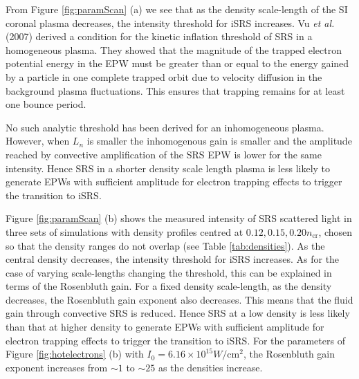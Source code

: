 From Figure \ref{fig:paramScan} (a) we see that as the density scale-length of the SI coronal plasma decreases, the intensity threshold for iSRS increases. Vu \textit{et al.} (2007) \cite{Vu2007} derived a condition for the kinetic inflation threshold of SRS in a homogeneous plasma. They showed that the magnitude of the trapped electron potential energy in the EPW must be greater than or equal to the energy gained by a particle in one complete trapped orbit due to velocity diffusion in the
background plasma fluctuations. This ensures that trapping remains for at least one bounce period.

No such analytic threshold has been derived for an inhomogeneous plasma.
However, when $L_n$ is smaller the inhomogenous gain is smaller and the amplitude reached by convective amplification of the SRS EPW is lower for the same intensity.
Hence SRS in a shorter density scale length plasma is less likely to generate EPWs with sufficient amplitude for electron trapping effects to trigger the transition to iSRS.

Figure \ref{fig:paramScan} (b) shows the measured intensity of SRS scattered light in three sets of simulations with density profiles centred at $0.12,0.15,0.20 n_\mathrm{cr}$, chosen so that the density ranges do not overlap (see Table \ref{tab:densities}). As the central density decreases, the intensity threshold for iSRS increases. As for the case of varying scale-lengths changing the threshold, this can be explained in terms of the Rosenbluth gain\cite{Rosenbluth1972}. For a fixed density scale-length, as the density decreases, the Rosenbluth gain exponent also decreases. This means that the fluid gain through convective SRS is reduced. Hence SRS at a low density is less likely than that at higher density to generate EPWs with sufficient amplitude for electron trapping effects to trigger the transition to iSRS. For the parameters of Figure \ref{fig:hotelectrons} (b) with $I_0 = 6.16\times 10^{15} \si{W / \centi \metre^2}$, the Rosenbluth gain exponent increases from $\sim1$ to $\sim25$ as the densities increase.

